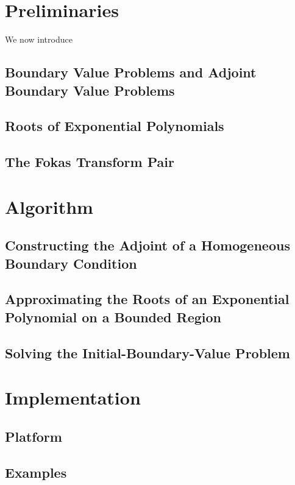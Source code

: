 \documentclass[11pt, oneside, a4paper]{article}
\begin{document}
\section{Preliminaries}
We now introduce 

\subsection{Boundary Value Problems and Adjoint Boundary Value Problems}
\subsection{Roots of Exponential Polynomials}
\subsection{The Fokas Transform Pair}

\section{Algorithm}
\subsection{Constructing the Adjoint of a Homogeneous Boundary Condition}
\subsection{Approximating the Roots of an Exponential Polynomial on a Bounded Region}
\subsection{Solving the Initial-Boundary-Value Problem}

\section{Implementation}
\subsection{Platform}
\subsection{Examples}

\pagebreak
{}

\newpage


\end{document}
